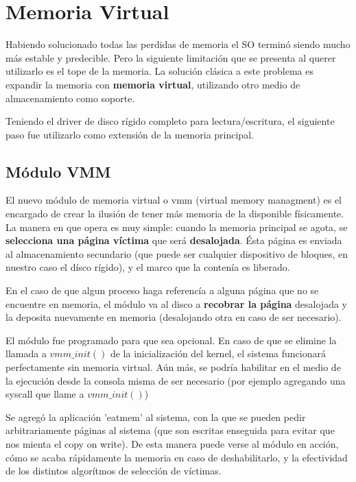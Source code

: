 \section{Memoria Virtual}

Habiendo solucionado todas las perdidas de memoria el SO terminó siendo mucho
más estable y predecible. Pero la siguiente limitación que se presenta al querer
utilizarlo es el tope de la memoria. La solución clásica a este problema es
expandir la memoria con \textbf{memoria virtual}, utilizando otro medio de
almacenamiento como soporte.

Teniendo el driver de disco rígido completo para lectura/escritura, el siguiente
paso fue utilizarlo como extensión de la memoria principal.

\subsection{Módulo VMM}

El nuevo módulo de memoria virtual o vmm (virtual memory managment) es el
encargado de crear la ilusión de tener más memoria de la disponible físicamente.
La manera en que opera es muy simple: cuando la memoria principal se agota, se
\textbf{selecciona una página víctima} que será \textbf{desalojada}. Ésta página es
enviada al almacenamiento secundario (que puede ser cualquier dispositivo de
bloques, en nuestro caso el dísco rígido), y el marco que la contenía es
liberado.

En el caso de que algun proceso haga referencía a alguna página que no se
encuentre en memoria, el módulo va al disco a \textbf{recobrar la página}
desalojada y la deposita nuevamente en memoria (desalojando otra en caso
de ser necesario).

El módulo fue programado para que sea opcional. En caso de que se elimine la
llamada a $vmm\_init()$ de la inicialización del kernel, el sistema funcionará
perfectamente sin memoria virtual. Aún más, se podría habilitar en el medio de
la ejecución desde la consola misma de ser necesario (por ejemplo agregando una
syscall que llame a $vmm\_init()$)

Se agregó la aplicación 'eatmem' al sistema, con la que se pueden pedir
arbitrariamente páginas al sistema (que son escritas enseguida para evitar que
nos mienta el copy on write). De esta manera puede verse al módulo en acción,
cómo se acaba rápidamente la memoria en caso de deshabilitarlo, y la efectividad
de los distintos algorítmos de selección de víctimas.

